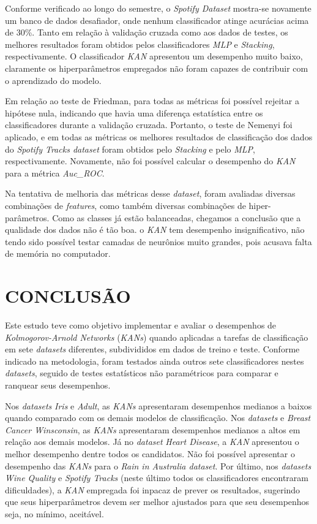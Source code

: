 \documentclass[journal]{IEEEtran}
\begin{document}
Conforme verificado ao longo do semestre, o \textit{Spotify Dataset} mostra-se novamente um banco de dados desafiador, onde nenhum classificador atinge acurácias acima de 30\%.
Tanto em relação à validação cruzada como aos dados de testes, os melhores resultados foram obtidos pelos classificadores \textit{MLP} e \textit{Stacking}, respectivamente. O classificador \textit{KAN} apresentou um desempenho muito baixo, claramente os hiperparâmetros empregados não foram capazes de contribuir com o aprendizado do modelo.

Em relação ao teste de Friedman, para todas as métricas foi possível rejeitar a hipótese nula, indicando que havia uma diferença estatística entre os classificadores durante a validação cruzada. Portanto, o teste de Nemenyi foi aplicado, e em todas as métricas os melhores resultados de classificação dos dados do \textit{Spotify Tracks dataset} foram obtidos pelo \textit{Stacking} e pelo \textit{MLP}, respectivamente. Novamente, não foi possível calcular o desempenho do \textit{KAN} para a métrica \textit{Auc\_ROC}.

Na tentativa de melhoria das métricas desse \textit{dataset}, foram avaliadas diversas combinações de \textit{features}, como também diversas combinações de hiper-parâmetros. Como as classes já estão balanceadas, chegamos a conclusão que a qualidade dos dados não é tão boa. o \textit{KAN} tem desempenho insignificativo, não tendo sido possível testar camadas de neurônios muito grandes, pois acusava falta de memória no computador.



\section{CONCLUSÃO}

Este estudo teve como objetivo implementar e avaliar o desempenhos de \textit{Kolmogorov-Arnold Networks} (\textit{KANs}) quando aplicadas a tarefas de classificação em sete \textit{datasets} diferentes, subdivididos em dados de treino e teste. Conforme indicado na metodologia, foram testados ainda outros sete classificadores nestes \textit{datasets}, seguido de testes estatísticos não paramétricos para comparar e ranquear seus desempenhos.

Nos \textit{datasets} \textit{Iris} e \textit{Adult}, as \textit{KANs} apresentaram desempenhos medianos a baixos quando comparado com os demais modelos de classificação. Nos \textit{datasets} e \textit{Breast Cancer Winsconsin}, as \textit{KANs} apresentaram desempenhos medianos a altos em relação aos demais modelos. Já no \textit{dataset} \textit{Heart Disease}, a \textit{KAN} apresentou o melhor desempenho dentre todos os candidatos. Não foi possível apresentar o desempenho das \textit{KANs} para o \textit{Rain in Australia dataset}. Por último, nos \textit{datasets} \textit{Wine Quality} e \textit{Spotify Tracks} (neste último todos os classificadores encontraram dificuldades), a \textit{KAN} empregada foi inpacaz de prever os resultados, sugerindo que seus hiperparâmetros devem ser melhor ajustados para que seu desempenhos seja, no mínimo, aceitável.
\end{document}
